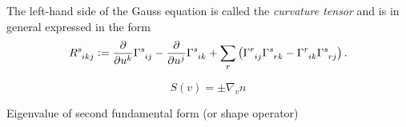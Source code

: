 \documentclass[../main.tex]{subfiles}
\begin{document}
\begin{remark}\label{Manifold:CurvatureTensor:ChristoffelSymbol}
    The left-hand side of the Gauss equation is called the \textit{curvature tensor}
    and is in general expressed in the form
    \begin{equation*}
        \tensor{R}{^s_i_k_j}
        \defeq
        \frac{\partial}{\partial\tensor{u}{^k}}\tensor{\Gamma}{^s_i_j}
        - \frac{\partial}{\partial\tensor{u}{^j}}\tensor{\Gamma}{^s_i_k}
        + \sum_{r}\left(\tensor{\Gamma}{^r_i_j}\tensor{\Gamma}{^s_r_k}-\tensor{\Gamma}{^r_i_k}\tensor{\Gamma}{^s_r_j}\right) \text{.}
    \end{equation*}
\end{remark}

\begin{example}\label{ShapeOperator}
    $$S\left(v\right)=\pm\nabla_v n$$
\end{example}
\begin{example}\label{PrincipalCurvature}
    Eigenvalue of second fundamental form (or shape operator)
\end{example}
\end{document}
